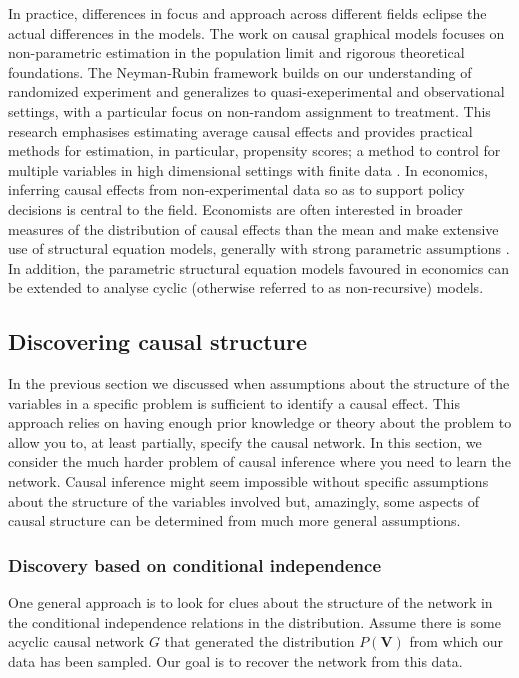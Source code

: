 \documentclass[11pt,a4paper]{article}
\begin{document}
In practice, differences in focus and approach across different fields eclipse the actual differences in the models. The work on causal graphical models \cite{Pearl2000,Sprites2000} focuses on non-parametric estimation in the population limit and rigorous theoretical foundations. The Neyman-Rubin framework builds on our understanding of randomized experiment and generalizes to quasi-exeperimental and observational settings, with a particular focus on non-random assignment to treatment. This research emphasises estimating average causal effects and provides practical methods for estimation, in particular, propensity scores; a method to control for multiple variables in high dimensional settings with finite data \cite{Rosenbaum1983}. In economics, inferring causal effects from non-experimental data so as to support policy decisions is central to the field. Economists are often interested in broader measures of the distribution of causal effects than the mean and make extensive use of structural equation models, generally with strong parametric assumptions \cite{Heckman2008}. In addition, the parametric structural equation models favoured in economics can be extended to analyse cyclic (otherwise referred to as non-recursive) models. 


\subsection{Discovering causal structure}

In the previous section we discussed when assumptions about the structure of the variables in a specific problem is sufficient to identify a causal effect. This approach relies on having enough prior knowledge or theory about the problem to allow you to, at least partially, specify the causal network. In this section, we consider the much harder problem of causal inference where you need to learn the network. Causal inference might seem impossible without specific assumptions about the structure of the variables involved but, amazingly, some aspects of causal structure can be determined from much more general assumptions.  

 
\subsubsection{Discovery based on conditional independence}
One general approach is to look for clues about the structure of the network in the conditional independence relations in the distribution. Assume there is some acyclic causal network $G$ that generated the distribution $P(\boldsymbol{V})$ from which our data has been sampled. Our goal is to recover the network from this data. 
\end{document}
